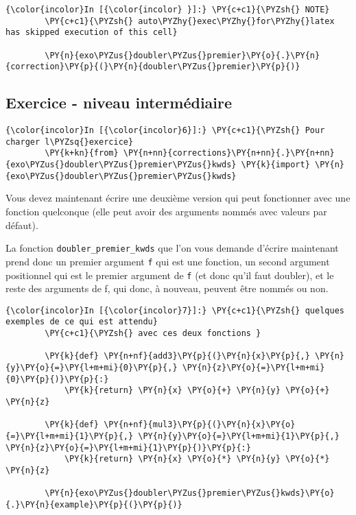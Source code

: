     \begin{Verbatim}[commandchars=\\\{\}]
{\color{incolor}In [{\color{incolor} }]:} \PY{c+c1}{\PYZsh{} NOTE}
        \PY{c+c1}{\PYZsh{} auto\PYZhy{}exec\PYZhy{}for\PYZhy{}latex has skipped execution of this cell}
        
        \PY{n}{exo\PYZus{}doubler\PYZus{}premier}\PY{o}{.}\PY{n}{correction}\PY{p}{(}\PY{n}{doubler\PYZus{}premier}\PY{p}{)}
\end{Verbatim}


    \hypertarget{exercice---niveau-intermuxe9diaire}{%
\subsection{Exercice - niveau
intermédiaire}\label{exercice---niveau-intermuxe9diaire}}

    \begin{Verbatim}[commandchars=\\\{\}]
{\color{incolor}In [{\color{incolor}6}]:} \PY{c+c1}{\PYZsh{} Pour charger l\PYZsq{}exercice}
        \PY{k+kn}{from} \PY{n+nn}{corrections}\PY{n+nn}{.}\PY{n+nn}{exo\PYZus{}doubler\PYZus{}premier\PYZus{}kwds} \PY{k}{import} \PY{n}{exo\PYZus{}doubler\PYZus{}premier\PYZus{}kwds}
\end{Verbatim}


    Vous devez maintenant écrire une deuxième version qui peut fonctionner
avec une fonction quelconque (elle peut avoir des arguments nommés avec
valeurs par défaut).

La fonction \texttt{doubler\_premier\_kwds} que l'on vous demande
d'écrire maintenant prend donc un premier argument \texttt{f} qui est
une fonction, un second argument positionnel qui est le premier argument
de \texttt{f} (et donc qu'il faut doubler), et le reste des arguments de
f, qui donc, à nouveau, peuvent être nommés ou non.

    \begin{Verbatim}[commandchars=\\\{\}]
{\color{incolor}In [{\color{incolor}7}]:} \PY{c+c1}{\PYZsh{} quelques exemples de ce qui est attendu}
        \PY{c+c1}{\PYZsh{} avec ces deux fonctions }
        
        \PY{k}{def} \PY{n+nf}{add3}\PY{p}{(}\PY{n}{x}\PY{p}{,} \PY{n}{y}\PY{o}{=}\PY{l+m+mi}{0}\PY{p}{,} \PY{n}{z}\PY{o}{=}\PY{l+m+mi}{0}\PY{p}{)}\PY{p}{:}
            \PY{k}{return} \PY{n}{x} \PY{o}{+} \PY{n}{y} \PY{o}{+} \PY{n}{z}
        
        \PY{k}{def} \PY{n+nf}{mul3}\PY{p}{(}\PY{n}{x}\PY{o}{=}\PY{l+m+mi}{1}\PY{p}{,} \PY{n}{y}\PY{o}{=}\PY{l+m+mi}{1}\PY{p}{,} \PY{n}{z}\PY{o}{=}\PY{l+m+mi}{1}\PY{p}{)}\PY{p}{:}
            \PY{k}{return} \PY{n}{x} \PY{o}{*} \PY{n}{y} \PY{o}{*} \PY{n}{z}
        
        \PY{n}{exo\PYZus{}doubler\PYZus{}premier\PYZus{}kwds}\PY{o}{.}\PY{n}{example}\PY{p}{(}\PY{p}{)}
\end{Verbatim}


